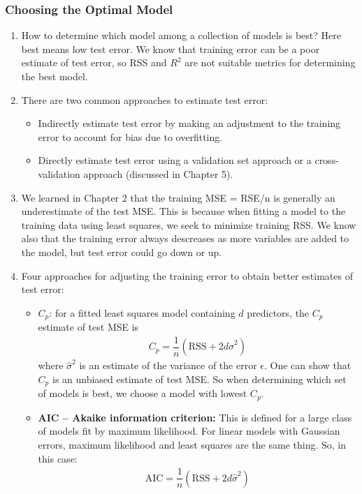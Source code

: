 \documentclass[10pt]{article}
\begin{document}
\subsubsection{Choosing the Optimal Model}
\begin{enumerate}
	\item How to determine which model among a collection of models is best?  Here best means low test error.  We know that training error can be a poor estimate of test error, so RSS and $R^2$ are not suitable metrics for determining the best model.
	\item There are two common approaches to estimate test error: \begin{itemize}
		\item Indirectly estimate test error by making an adjustment to the training error to account for bias due to overfitting.
		\item Directly estimate test error using a validation set approach or a cross-validation approach (discussed in Chapter 5).
		\end{itemize}
	\item We learned in Chapter 2 that the training MSE = RSE/n is generally an underestimate of the test MSE.  This is because when fitting a model to the training data using least squares, we seek to minimize training RSS.  We know also that the training error always descreases as more variables are added to the model, but test error could go down or up.
	\item Four approaches for adjusting the training error to obtain better estimates of test error: 
	\begin{itemize}
		\item {\textbf{$C_p$}}: for a fitted least squares model containing $d$ predictors, the $C_p$ estimate of test MSE is 
		\begin{align*}
			C_p = \dfrac{1}{n}(\mathrm{RSS} + 2d \hat \sigma^2)
		\end{align*}
		where $\hat \sigma^2$ is an estimate of the variance of the error $\epsilon$.  One can show that $C_p$ is an unbiased estimate of test MSE.  So when determining which set of models is best, we choose a model with lowest $C_p$.
		\item \textbf{AIC -- Akaike information criterion:}  This is defined for a large class of models fit by maximum likelihood.  For linear models with Gaussian errors, maximum likelihood and least squares are the same thing.  So, in this case:
		\begin{align*}
			\mathrm{AIC} = \dfrac{1}{n} (\mathrm{RSS} + 2 d \hat \sigma^2) 

\end{align*}
\end{itemize}
\end{enumerate}
\end{document}
